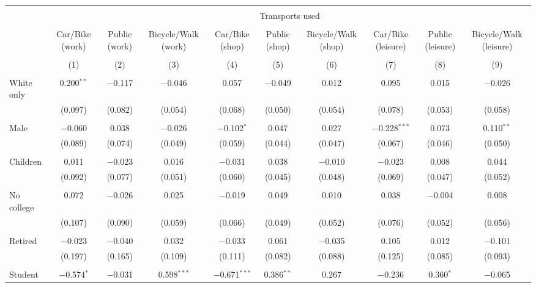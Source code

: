
\begin{tabular}{@{\extracolsep{5pt}}lccccccccc} 
\\[-1.8ex]\hline 
\hline \\[-1.8ex] 
 & \multicolumn{9}{c}{Transports used} \\ 
\cline{2-10} 
\\[-1.8ex] & Car/Bike (work) & Public (work) & Bicycle/Walk (work) & Car/Bike (shop) & Public (shop) & Bicycle/Walk (shop) & Car/Bike (leisure) & Public (leisure) & Bicycle/Walk (leisure) \\ 
\\[-1.8ex] & (1) & (2) & (3) & (4) & (5) & (6) & (7) & (8) & (9)\\ 
\hline \\[-1.8ex] 
 White only & 0.200$^{**}$ & $-$0.117 & $-$0.046 & 0.057 & $-$0.049 & 0.012 & 0.095 & 0.015 & $-$0.026 \\ 
  & (0.097) & (0.082) & (0.054) & (0.068) & (0.050) & (0.054) & (0.078) & (0.053) & (0.058) \\ 
  & & & & & & & & & \\ 
 Male & $-$0.060 & 0.038 & $-$0.026 & $-$0.102$^{*}$ & 0.047 & 0.027 & $-$0.228$^{***}$ & 0.073 & 0.110$^{**}$ \\ 
  & (0.089) & (0.074) & (0.049) & (0.059) & (0.044) & (0.047) & (0.067) & (0.046) & (0.050) \\ 
  & & & & & & & & & \\ 
 Children & 0.011 & $-$0.023 & 0.016 & $-$0.031 & 0.038 & $-$0.010 & $-$0.023 & 0.008 & 0.044 \\ 
  & (0.092) & (0.077) & (0.051) & (0.060) & (0.045) & (0.048) & (0.069) & (0.047) & (0.052) \\ 
  & & & & & & & & & \\ 
 No college & 0.072 & $-$0.026 & 0.025 & $-$0.019 & 0.049 & 0.010 & 0.038 & $-$0.004 & 0.008 \\ 
  & (0.107) & (0.090) & (0.059) & (0.066) & (0.049) & (0.052) & (0.076) & (0.052) & (0.056) \\ 
  & & & & & & & & & \\ 
 Retired & $-$0.023 & $-$0.040 & 0.032 & $-$0.033 & 0.061 & $-$0.035 & 0.105 & 0.012 & $-$0.101 \\ 
  & (0.197) & (0.165) & (0.109) & (0.111) & (0.082) & (0.088) & (0.125) & (0.085) & (0.093) \\ 
  & & & & & & & & & \\ 
 Student & $-$0.574$^{*}$ & $-$0.031 & 0.598$^{***}$ & $-$0.671$^{***}$ & 0.386$^{**}$ & 0.267 & $-$0.236 & 0.360$^{*}$ & $-$0.065 \\ 

\end{tabular}
